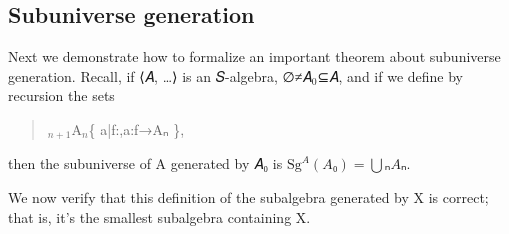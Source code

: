 \documentclass[a4paper,USenglish,cleveref,autoref,thm-restate]{lipics-v2019}
\begin{document}
\subsection{Subuniverse generation}\label{sec:subuniverse-generation}
Next we demonstrate how to formalize an important theorem about subuniverse generation. Recall, if \AS\ASy{=}\AS⟨\AB 𝐴, …⟩ is an 𝑆-algebra, \ASy ∅\AS\ASy ≠\AS\AB 𝐴\(_0\)\AS\ASy ⊆\AS\AB 𝐴, and if we define by recursion the sets
\begin{quote}
  \(_{n+1}\)\AS\ASy{=}\AS\AB A\(_n\)\AS{}\AS \{ \fA\AS\AB a\AS|\AS\AB f\AS\ASy :\AS\univS\ASy ,\AS\AB a\ASy :\AS\arityS\AS\AB f\ASy →\AS\AB Aₙ \},
\end{quote}
then the subuniverse of A generated by 𝐴₀ is \(\mathrm{Sg}^A(A₀) = ⋃ₙ Aₙ\).
\begin{code}\end{code}
We now verify that this definition of the subalgebra generated by \AB X is correct; that is, it's the smallest subalgebra containing \AB X.
\begin{code}\end{code}
\end{document}
